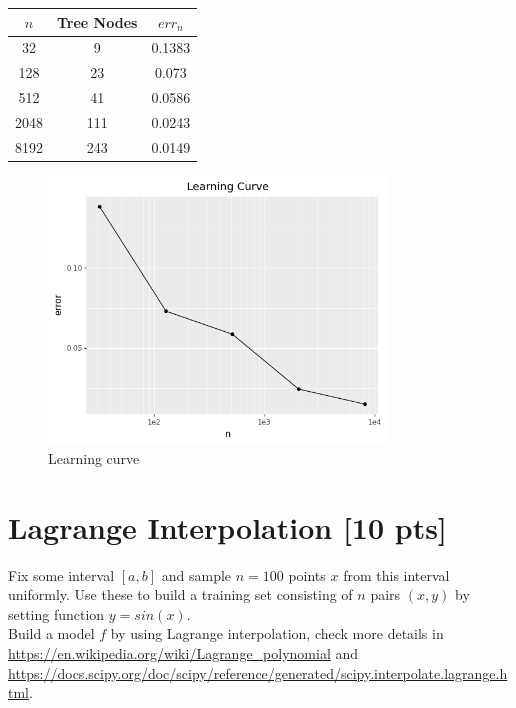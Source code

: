 \documentclass[a4paper]{article}
\theoremstyle{definition}
\newenvironment{soln}{
    \leavevmode\color{blue}\ignorespaces
}{}
\begin{document}
\begin{soln}
  \begin{center}
    \begin{tabular}{|c|c|c|}
      \hline
      $n$ & Tree Nodes & $err_n$ \\
      \hline
      32  &  9  &  0.1383  \\
      128  &  23  &  0.073  \\
      512  &  41  &  0.0586  \\
      2048  &  111  &  0.0243  \\
      8192  &  243  &  0.0149  \\
      \hline
    \end{tabular}
  \end{center}

  \begin{figure}[H]
    \centering
    \includegraphics[width=0.8\textwidth]{../plots/sklearn_error_curve.png}
    \caption{Learning curve}
    \label{fig:sklearn_error_curve} 
  \end{figure}
\end{soln}

\section{Lagrange Interpolation [10 pts]}
Fix some interval $[a, b]$ and sample $n = 100$ points $x$ from this interval uniformly. Use these to build a training set consisting of $n$ pairs $(x, y)$ by setting function $y = sin(x)$. \\

Build a model $f$ by using Lagrange interpolation, check more details in \url{https://en.wikipedia.org/wiki/Lagrange_polynomial} and \url{https://docs.scipy.org/doc/scipy/reference/generated/scipy.interpolate.lagrange.html}. \\
\end{document}
